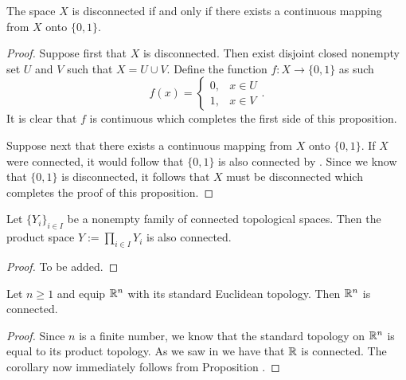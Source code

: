 \documentclass[11pt,a4paper]{article}
\begin{document}
\begin{proposition}
  The space $X$ is disconnected if and only if there exists a continuous 
  mapping from $X$ onto $\{0, 1\}$.
\end{proposition}
\begin{proof}
  Suppose first that $X$ is disconnected.
  Then exist disjoint closed nonempty set $U$ and $V$ such that
  $X = U \cup V$.
  Define the function $f \colon X \to \{0, 1\}$ as such
  \[
    f(x) =
    \begin{cases}
      0, &x \in U \\
      1, &x \in V
    \end{cases}.
  \]
  It is clear that $f$ is continuous which completes the first side
  of this proposition.

  Suppose next that there exists a continuous mapping from $X$ onto 
  $\{0, 1\}$.
  If $X$ were connected, it would follow that $\{0,1\}$ is also connected
  by .
  Since we know that $\{0,1\}$ is disconnected, it follows that $X$
  must be disconnected which completes the proof of this proposition.
\end{proof}

\begin{proposition}\label{prp:product-connected}
  Let $\{Y_i\}_{i \in I}$ be a nonempty family of connected topological 
  spaces. Then the product space $Y := \prod_{i \in I} Y_i$ is also connected.
\end{proposition}
\begin{proof}
  To be added.
\end{proof}

\begin{corollary}
  Let $n \geq 1$ and equip $\mathbb{R}^n$ with its standard Euclidean topology.
  Then $\mathbb{R}^n$ is connected.
\end{corollary}
\begin{proof}
  Since $n$ is a finite number, we know that the standard topology on
  $\mathbb{R}^n$ is equal to its product topology.
  As we saw in  we have that
  $\mathbb{R}$ is connected.
  The corollary now immediately follows from Proposition 
  .
\end{proof}
\end{document}
